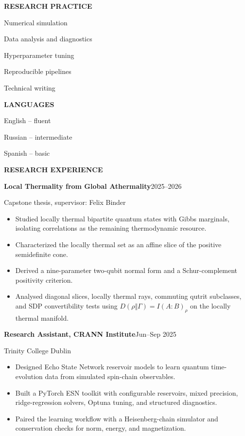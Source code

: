 \documentclass[10pt,a4paper]{article}
\newcommand{\sectiontitle}[1]{%
  \vspace{9pt}
  {\small\bfseries\color{accent}\MakeUppercase{#1}}\par
  \vspace{2.7pt}{\color{rule}\hrule height 0.55pt}\vspace{5.2pt}
}
\newcommand{\role}[3]{%
  {\bfseries #1}\hfill{\small\color{muted}#2}\par
  {\small\color{muted}#3}\par
}
\begin{document}
\begin{minipage}[t][0.835\textheight][t]{0.315\linewidth}
\sectiontitle{Research Practice}
{\small
Numerical simulation\par
Data analysis and diagnostics\par
Hyperparameter tuning\par
Reproducible pipelines\par
Technical writing\par
}

\vfill
\sectiontitle{Languages}
{\small English -- fluent\par Russian -- intermediate\par Spanish -- basic}

\end{minipage}
\hfill
\begin{minipage}[t][0.835\textheight][t]{0.645\linewidth}
\raggedright

\sectiontitle{Research Experience}

\role{Local Thermality from Global Athermality}{2025--2026}{Capstone thesis, supervisor: Felix Binder}
\begin{itemize}
  \item Studied locally thermal bipartite quantum states with Gibbs marginals, isolating correlations as the remaining thermodynamic resource.
  \item Characterized the locally thermal set as an affine slice of the positive semidefinite cone.
  \item Derived a nine-parameter two-qubit normal form and a Schur-complement positivity criterion.
  \item Analysed diagonal slices, locally thermal rays, commuting qutrit subclasses, and SDP convertibility tests using \(D(\rho\Vert\Gamma)=I(A:B)_\rho\) on the locally thermal manifold.
\end{itemize}
\vspace{2pt}

\role{Research Assistant, CRANN Institute}{Jun--Sep 2025}{Trinity College Dublin}
\begin{itemize}
  \item Designed Echo State Network reservoir models to learn quantum time-evolution data from simulated spin-chain observables.
  \item Built a PyTorch ESN toolkit with configurable reservoirs, mixed precision, ridge-regression solvers, Optuna tuning, and structured diagnostics.
  \item Paired the learning workflow with a Heisenberg-chain simulator and conservation checks for norm, energy, and magnetization.
\end{itemize}
\vspace{2pt}


\end{minipage}
\end{document}
